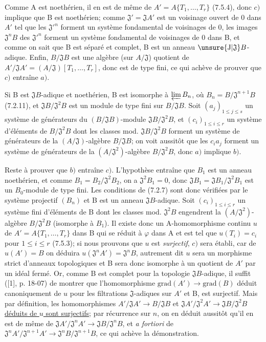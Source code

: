 Comme A est noethérien, il en est de même de $A'=A\{T_1,\ldots,T_r\}$ (7.5.4), donc $c)$ implique que B est noethérien; comme $\mathfrak J'=\mathfrak JA'$ est un voisinage ouvert de 0 dans $A'$ tel que les $\mathfrak J'^n$ forment un système fondamental de voisinages de 0, les images $\mathfrak J^nB$ des $\mathfrak J'^n$ forment un système fondamental de voisinages de 0 dans B, et comme on sait que B est séparé et complet, B est un anneau $\unsure{\mathrm J|\mathfrak J}B$-adique. Enfin, $B/\mathfrak JB$ est une algèbre (sur $A/\mathfrak J$) quotient de $A'/\mathfrak JA'=(A/\mathfrak J)[T_1,\ldots,T_r]$, donc est de type fini, ce qui achève de prouver que $c)$ entraîne $a)$.

Si B est $\mathfrak JB$-adique et noethérien, B est isomorphe à $\varprojlim B_n$, où $B_n=B/\mathfrak J^{n+1}B$ (7.2.11), et $\mathfrak JB/\mathfrak J^2B$ est un module de type fini sur $B/\mathfrak JB$. Soit $(a_j)_{1\leq j\leq s}$ un système de générateurs du $(B/\mathfrak JB)$-module $\mathfrak JB/\mathfrak J^2B$, et $(c_i)_{1\leq i\leq r}$ un système d'éléments de $B/\mathfrak J^2B$ dont les classes mod. $\mathfrak JB/\mathfrak J^2B$ forment un système de générateurs de la $(A/\mathfrak J)$-algèbre $B/\mathfrak JB$; on voit aussitôt que les $c_i a_j$ forment un système de générateurs de la $(A/\mathfrak J^2)$-algèbre $B/\mathfrak J^2B$, donc $a)$ implique $b)$.

Reste à prouver que $b)$ entraîne $c)$. L'hypothèse entraîne que $B_1$ est un anneau noethérien, et comme $B_1=B_2/\mathfrak J^2B_2$, on a $\mathfrak J^2B_1=0$, donc $\mathfrak JB_1=\mathfrak JB_1/\mathfrak J^2B_1$ est un $B_0$-module de type fini. Les conditions de (7.2.7) sont donc vérifiées par le système projectif $(B_n)$ et B est un anneau $\mathfrak JB$-adique. Soit $(c_i)_{1\leq i\leq r}$ un système fini d'éléments de B dont les classes mod. $\mathfrak J^2B$ engendrent la $(A/\mathfrak J^2)$-algèbre $B/\mathfrak J^2B$ (isomorphe à $B_1$).
Il existe donc un A-homomorphisme continu $u$ de $A'=A\{T_1,\ldots,T_r\}$ dans B qui se réduit à $\varphi$ dans A et est tel que $u(T_i)=c_i$ pour $1\leq i\leq r$ (7.5.3); si nous prouvons que $u$ est \textit{surjectif}, $c)$ sera établi, car de $u(A')=B$ on déduira $u(\mathfrak J^nA')=\mathfrak J^nB$, autrement dit $u$ sera un morphisme strict d'anneaux topologiques et B sera donc isomorphe à un quotient de $A'$ par un idéal fermé. Or, comme B est complet pour la topologie $\mathfrak JB$-adique, il suffit ([1], p. 18-07) de montrer que l'homomorphisme $\mathrm{grad}(A')\to\mathrm{grad}(B)$ déduit canoniquement de $u$ pour les filtrations $\mathfrak J$-adiques sur $A'$ et B, est surjectif. Mais par définition, les homomorphismes $A'/\mathfrak JA'\to B/\mathfrak JB$ et \uline{$\mathfrak JA'/\mathfrak J^2A'\to\mathfrak JB/\mathfrak J^2B$ déduits de $u$ sont surjectifs}; par récurrence sur $n$, on en déduit aussitôt qu'il en est de même de $\mathfrak JA'/\mathfrak J^nA'\to\mathfrak JB/\mathfrak J^nB$, et \textit{a fortiori} de $\mathfrak J^nA'/\mathfrak J^{n+1}A'\to\mathfrak J^nB/\mathfrak J^{n+1}B$, ce qui achève la démonstration.
\margin{!}


